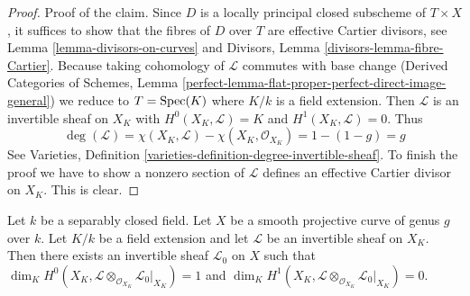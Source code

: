 \begin{proof}
\medskip\noindent
Proof of the claim. Since $D$ is a locally principal closed subscheme
of $T \times X$, it suffices to show that the fibres of $D$ over $T$ are
effective Cartier divisors, see Lemma \ref{lemma-divisors-on-curves} and
Divisors, Lemma \ref{divisors-lemma-fibre-Cartier}. Because taking
cohomology of $\mathcal{L}$ commutes with base change
(Derived Categories of Schemes, Lemma
\ref{perfect-lemma-flat-proper-perfect-direct-image-general})
we reduce to $T = \mathop{\mathrm{Spec}}(K)$ where $K/k$ is a field extension.
Then $\mathcal{L}$ is an invertible sheaf on $X_K$ with
$H^0(X_K, \mathcal{L}) = K$ and $H^1(X_K, \mathcal{L}) = 0$. Thus
$$
\deg(\mathcal{L}) = \chi(X_K, \mathcal{L}) - \chi(X_K, \mathcal{O}_{X_K})
= 1 - (1 - g) = g
$$
See Varieties, Definition \ref{varieties-definition-degree-invertible-sheaf}.
To finish the proof we have to show a nonzero section of $\mathcal{L}$
defines an effective Cartier divisor on $X_K$.
This is clear.
\end{proof}

\begin{lemma}
\label{lemma-twist-with-general-divisor}
Let $k$ be a separably closed field. Let $X$ be a smooth projective
curve of genus $g$ over $k$. Let $K/k$ be a field extension and let
$\mathcal{L}$ be an invertible sheaf on $X_K$. Then there exists an
invertible sheaf $\mathcal{L}_0$ on $X$ such that
$\dim_K H^0(X_K,
\mathcal{L} \otimes_{\mathcal{O}_{X_K}} \mathcal{L}_0|_{X_K}) = 1$ and
$\dim_K H^1(X_K,
\mathcal{L} \otimes_{\mathcal{O}_{X_K}} \mathcal{L}_0|_{X_K}) = 0$.
\end{lemma}


